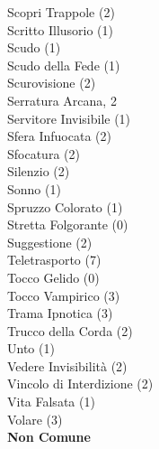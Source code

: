\begin{multicols}{3}
{	Scopri Trappole (2)\\
	Scritto Illusorio (1)\\
	Scudo (1)\\
	Scudo della Fede (1)\\
	Scurovisione (2)\\
	Serratura Arcana, 2\\
	Servitore Invisibile (1)\\
	Sfera Infuocata (2)\\
	Sfocatura (2)\\
	Silenzio (2)\\
	Sonno (1)\\
	Spruzzo Colorato (1)\\
	Stretta Folgorante (0)\\
	Suggestione (2)\\
	Teletrasporto (7)\\
	Tocco Gelido (0)\\
	Tocco Vampirico (3)\\
	Trama Ipnotica (3)\\
	Trucco della Corda (2)\\
	Unto (1)\\
	Vedere Invisibilità (2)\\
	Vincolo di Interdizione (2)\\
	Vita Falsata (1)\\
	Volare (3)\\

	\medskip\textbf{Non Comune}\medskip

}
\end{multicols}

